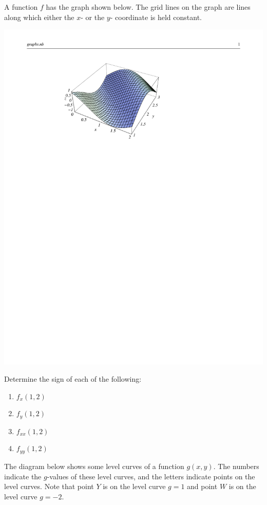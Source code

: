 \documentclass[M3_Night4_Solutions]{subfiles}
\begin{document}
\item A function $f$ has the graph shown below.  The grid lines on the graph are lines 
along which either the $x$- or the $y$- coordinate is held constant.

\includegraphics[width=6in]{figs/Graph_ContourLines} 

Determine the sign of each of the following:
\begin{multicols}{2}
\begin{enumerate}
\item $f_x(1, 2)$
\item $f_y(1, 2)$
\item $f_{xx}(1, 2)$
\item $f_{yy}(1, 2)$
\end{enumerate}
\end{multicols}

\item The diagram below shows some level curves of a function $g(x,y)$.  The numbers 
indicate the $g$-values of these level curves, and the letters indicate points on the level curves.  Note that point $Y$ is on  the level curve $g = 1$ and point $W$ is on the level curve $g = -2$.
\end{document}
